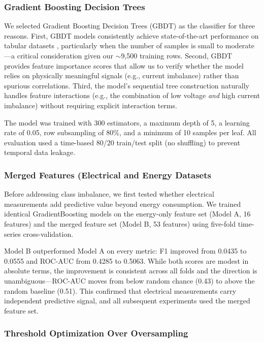 \documentclass{article}
\begin{document}
\subsubsection{Gradient Boosting Decision Trees}

We selected Gradient Boosting Decision Trees (GBDT) as the classifier for three reasons. First, GBDT models consistently achieve state-of-the-art performance on tabular datasets \cite{shwartz2022tabular}, particularly when the number of samples is small to moderate---a critical consideration given our $\sim$9,500 training rows. Second, GBDT provides feature importance scores that allow us to verify whether the model relies on physically meaningful signals (e.g., current imbalance) rather than spurious correlations. Third, the model's sequential tree construction naturally handles feature interactions (e.g., the combination of low voltage \textit{and} high current imbalance) without requiring explicit interaction terms.

The model was trained with 300 estimators, a maximum depth of 5, a learning rate of 0.05, row subsampling of 80\%, and a minimum of 10 samples per leaf. All evaluation used a time-based 80/20 train/test split (no shuffling) to prevent temporal data leakage.

\subsubsection{Merged Features (Electrical and Energy Datasets}

Before addressing class imbalance, we first tested whether electrical measurements add predictive value beyond energy consumption. We trained identical GradientBoosting models on the energy-only feature set (Model A, 16 features) and the merged feature set (Model B, 53 features) using five-fold time-series cross-validation.

Model B outperformed Model A on every metric: F1 improved from 0.0435 to 0.0555 and ROC-AUC from 0.4285 to 0.5063. While both scores are modest in absolute terms, the improvement is consistent across all folds and the direction is unambiguous---ROC-AUC moves from below random chance (0.43) to above the random baseline (0.51). This confirmed that electrical measurements carry independent predictive signal, and all subsequent experiments used the merged feature set.

\subsubsection{Threshold Optimization Over Oversampling}
\end{document}
